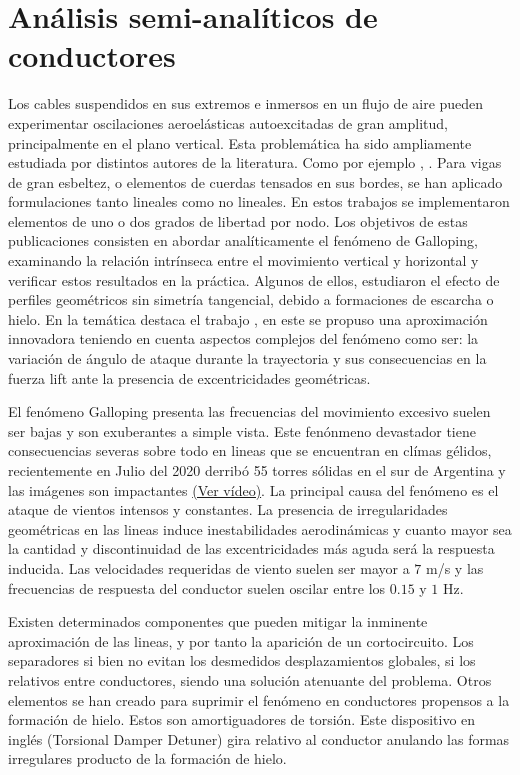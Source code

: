 \section{Análisis semi-analíticos de conductores}\label{Sec:EA:Galloping}

Los cables suspendidos en sus extremos e inmersos en un flujo de aire pueden experimentar oscilaciones aeroelásticas autoexcitadas de gran amplitud, principalmente en el plano vertical. Esta problemática ha sido ampliamente estudiada por distintos autores de la literatura. Como por ejemplo \cite{blevins1990van}, \cite{jones1992coupled}. Para vigas de gran esbeltez, o elementos de cuerdas tensados en sus bordes, se han aplicado formulaciones tanto lineales como no lineales.  En estos trabajos se implementaron elementos de uno o dos grados de libertad por nodo. Los objetivos de estas publicaciones consisten en abordar analíticamente el fenómeno de Galloping, examinando la relación intrínseca entre el movimiento vertical y horizontal y verificar estos resultados en la práctica. Algunos de ellos, estudiaron el efecto de perfiles geométricos sin simetría tangencial, debido a formaciones de escarcha o  hielo. En la temática destaca el trabajo \textcite{chabart1998galloping}, en este se propuso una aproximación innovadora teniendo en cuenta aspectos complejos del fenómeno como ser: la variación de ángulo de ataque durante la trayectoria y sus consecuencias en la fuerza lift ante la presencia de excentricidades geométricas. 

El fenómeno Galloping presenta las frecuencias del movimiento excesivo suelen ser bajas y son exuberantes a simple vista. Este fenónmeno devastador tiene consecuencias severas sobre todo en lineas que se encuentran en clímas gélidos, recientemente en Julio del 2020 derribó 55 torres sólidas en el sur de Argentina y las imágenes son impactantes \href{blob:https://www.clarin.com/df740f0f-cd9a-4b9a-8c55-c594c9ea262c}{(Ver vídeo)}. La principal causa del fenómeno es el ataque de vientos intensos y constantes. La presencia de irregularidades geométricas en las lineas induce inestabilidades aerodinámicas y cuanto mayor sea la cantidad y discontinuidad de las excentricidades más aguda será la respuesta inducida. Las velocidades requeridas de viento suelen ser mayor a $7$ m/s y las frecuencias de respuesta del conductor suelen oscilar entre los $ 0.15$ y $1$ Hz.

 Existen determinados componentes que pueden mitigar la inminente aproximación de las lineas, y por tanto la aparición de un cortocircuito. Los separadores si bien no evitan los desmedidos desplazamientos globales, si los relativos entre conductores, siendo una solución atenuante del problema. Otros elementos se han creado para suprimir el fenómeno en conductores propensos a la formación de hielo. Estos son amortiguadores de torsión. Este dispositivo en inglés (Torsional Damper Detuner) gira relativo al conductor anulando las formas irregulares producto de la formación de hielo.  


